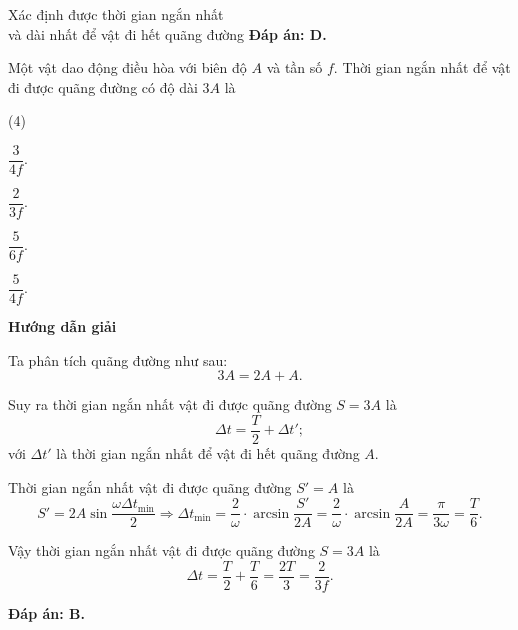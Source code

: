 \begin{dang}{Xác định được thời gian ngắn nhất\\ và dài nhất để vật đi hết quãng đường}
{		\textbf{Đáp án: D.}
	}
	{
		Một vật dao động điều hòa với biên độ $A$ và tần số $f$. Thời gian ngắn nhất để vật đi được quãng đường có độ dài $3A$ là
		\begin{mcq}(4)
			\item $\dfrac{3}{4f}$.
			\item $\dfrac{2}{3f}$.
			\item $\dfrac{5}{6f}$.
			\item $\dfrac{5}{4f}$.
		\end{mcq}
	}
	{
		\begin{center}
			\textbf{Hướng dẫn giải}
		\end{center}
		
		Ta phân tích quãng đường như sau:
		\begin{equation*}
			3A=2A+A.
		\end{equation*}
		
		Suy ra thời gian ngắn nhất vật đi được quãng đường $S=3A$ là
		\begin{equation*}
			\Delta t=\dfrac{T}{2}+\Delta t';
		\end{equation*}
		với $\Delta t'$ là thời gian ngắn nhất để vật đi hết quãng đường $A$.
		
		Thời gian ngắn nhất vật đi được quãng đường $S'=A$ là
		\begin{equation*}
			S'=2A\sin\dfrac{\omega\Delta t_\text{min}}{2}\Rightarrow \Delta t_\text{min}=\dfrac{2}{\omega}\cdot \arcsin \dfrac{S'}{2A}=\dfrac{2}{\omega}\cdot \arcsin \dfrac{A}{2A}=\dfrac{\pi}{3\omega}=\dfrac{T}{6}.
		\end{equation*}
		
		Vậy thời gian ngắn nhất vật đi được quãng đường $S=3A$ là
		\begin{equation*}
			\Delta t=\dfrac{T}{2}+\dfrac{T}{6}=\dfrac{2T}{3}=\dfrac{2}{3f}.
		\end{equation*}
		
		\textbf{Đáp án: B.}
	}
\end{dang}